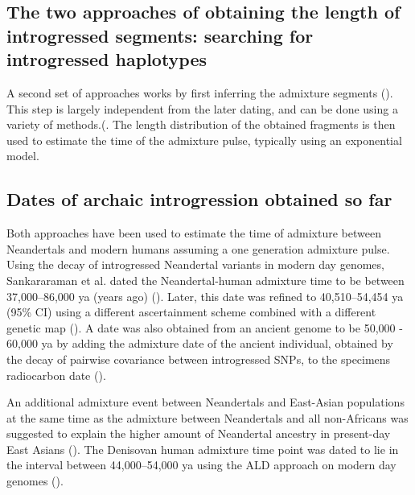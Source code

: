 \documentclass[]{article}
\begin{document}
\subsection{The two approaches of obtaining the length of introgressed
segments: searching for introgressed
haplotypes}\label{the-two-approaches-of-obtaining-the-length-of-introgressed-segments-searching-for-introgressed-haplotypes}

A second set of approaches works by first inferring the admixture segments
(\cite{gravel_population_2012,price_sensitive_2009,lawson_inference_2012}). This step is largely independent from the later dating, and can be done using a variety of methods.(\cite{lawson_inference_2012,racimo_signatures_2017,seguin_orlando_paleogenomics_2014,vernot_excavating_2016,sankararaman_combined_2016,skov_detecting_2018}. The length distribution of the obtained fragments is then used to estimate the time of the admixture pulse, typically using an exponential model.

\subsection{Dates of archaic introgression obtained so
far}\label{dates-of-archaic-introgression-obtained-so-far}

Both approaches have been used to estimate the time of admixture between
Neandertals and modern humans assuming a one generation admixture pulse.
Using the decay of introgressed Neandertal variants in modern day
genomes, Sankararaman et al. dated the Neandertal-human admixture time to
be  between 37,000--86,000 ya (years ago) (\cite{sankararaman_date_2012}). Later,
this date was refined to 40,510--54,454 ya (95\% CI) using a different
ascertainment scheme combined with a different genetic map
(\cite{moorjani_genetic_2016}). A date was also obtained from an ancient
genome to be 50,000 - 60,000 ya by adding the admixture date of the
ancient individual, obtained by the decay of pairwise covariance between
introgressed SNPs, to the specimens radiocarbon date
(\cite{fu_genome_2014}).

An additional admixture event between Neandertals and East-Asian
populations at the same time as the admixture between Neandertals and
all non-Africans was suggested to explain the higher amount of
Neandertal ancestry in present-day East Asians
(\cite{kim_selection_2015,vernot_complex_2015}). The Denisovan human
admixture time point was dated to lie in the interval between 44,000--54,000 ya using the ALD
approach on modern day genomes (\cite{sankararaman_combined_2016}).
\end{document}
